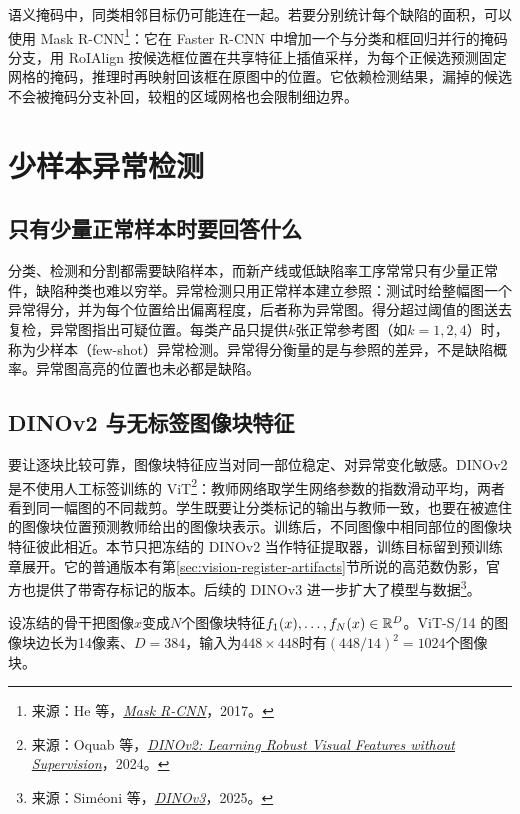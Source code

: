 语义掩码中，同类相邻目标仍可能连在一起。若要分别统计每个缺陷的面积，可以使用 Mask R-CNN\footnote{来源：He 等，\href{https://arxiv.org/abs/1703.06870}{\textit{Mask R-CNN}}，2017。}：它在 Faster R-CNN 中增加一个与分类和框回归并行的掩码分支，用 RoIAlign 按候选框位置在共享特征上插值采样，为每个正候选预测固定网格的掩码，推理时再映射回该框在原图中的位置。它依赖检测结果，漏掉的候选不会被掩码分支补回，较粗的区域网格也会限制细边界。

\section{少样本异常检测}
\label{sec:vision-fewshot-ad}
\subsection{只有少量正常样本时要回答什么}
分类、检测和分割都需要缺陷样本，而新产线或低缺陷率工序常常只有少量正常件，缺陷种类也难以穷举。异常检测只用正常样本建立参照：测试时给整幅图一个异常得分，并为每个位置给出偏离程度，后者称为异常图。得分超过阈值的图送去复检，异常图指出可疑位置。每类产品只提供$k$张正常参考图（如$k=1,2,4$）时，称为少样本（few-shot）异常检测。异常得分衡量的是与参照的差异，不是缺陷概率。异常图高亮的位置也未必都是缺陷。

\subsection{DINOv2 与无标签图像块特征}
要让逐块比较可靠，图像块特征应当对同一部位稳定、对异常变化敏感。DINOv2 是不使用人工标签训练的 ViT\footnote{来源：Oquab 等，\href{https://arxiv.org/abs/2304.07193}{\textit{DINOv2: Learning Robust Visual Features without Supervision}}，2024。}：教师网络取学生网络参数的指数滑动平均，两者看到同一幅图的不同裁剪。学生既要让分类标记的输出与教师一致，也要在被遮住的图像块位置预测教师给出的图像块表示。训练后，不同图像中相同部位的图像块特征彼此相近。本节只把冻结的 DINOv2 当作特征提取器，训练目标留到预训练章展开。它的普通版本有第\ref{sec:vision-register-artifacts}节所说的高范数伪影，官方也提供了带寄存标记的版本。后续的 DINOv3 进一步扩大了模型与数据\footnote{来源：Siméoni 等，\href{https://arxiv.org/abs/2508.10104}{\textit{DINOv3}}，2025。}。

设冻结的骨干把图像$x$变成$N$个图像块特征$f_1(x),\ldots,f_N(x)\in\mathbb{R}^D$。ViT-S/14 的图像块边长为14像素、$D=384$，输入为$448\times448$时有$(448/14)^2=1024$个图像块。

